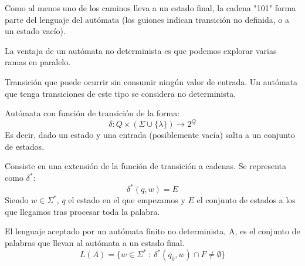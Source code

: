 \documentclass{apuntes}
\begin{document}
\begin{example}
\begin{tabbing}
 \end{tabbing}
 
Como al menos uno de los caminos lleva a un estado final, la cadena "101" forma parte del lenguaje del autómata (los guiones indican transición no definida, o a un estado vacío).

La ventaja de un autómata no determinista es que podemos explorar varias ramas en paralelo.
\end{example}


\begin{defn}
Transición que puede ocurrir sin consumir ningún valor de entrada. Un autómata que tenga transiciones de este tipo se considera no determinista.
\end{defn}

\begin{defn}
Autómata con función de transición de la forma:
\[\delta: Q\times (\Sigma \cup \lbrace \lambda \rbrace) \rightarrow 2^Q\]
Es decir, dado un estado y una entrada (posiblemente vacía) salta a un conjunto de estados.
\end{defn}

\begin{defn}
Consiste en una extensión de la función de transición a cadenas. Se representa como $\delta ^*$:
\[\delta^*(q, w) = E\]
Siendo $w\in \Sigma ^*$, $q$ el estado en el que empezamos y $E$ el conjunto de estados a los que llegamos tras procesar toda la palabra.
\end{defn}

\begin{defn}
El lenguaje aceptado por un autómata finito no determinista, A, es el conjunto de palabras que llevan al autómata a un estado final.
\[L(A) = \lbrace w \in \Sigma^* \ : \ \delta^*(q_0, w)\cap F \neq \emptyset \rbrace\]
\end{defn}
\end{document}
